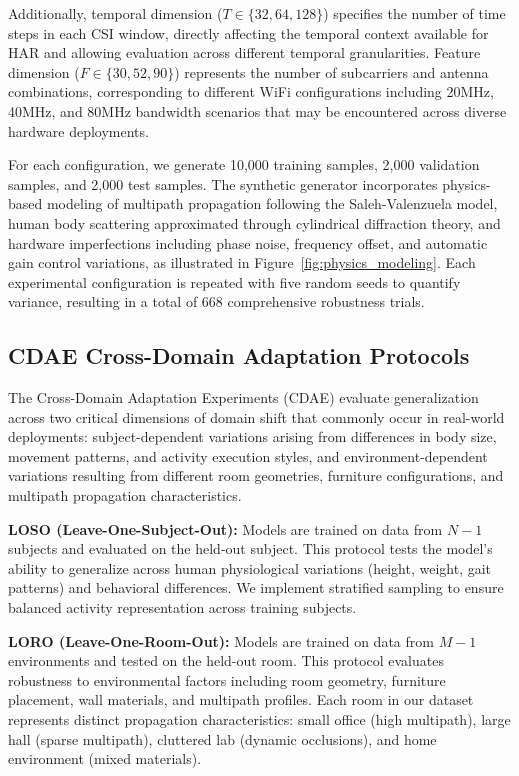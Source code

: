 \documentclass[lettersize,journal]{IEEEtran}
\begin{document}
Additionally, temporal dimension ($T \in \{32, 64, 128\}$) specifies the number of time steps in each CSI window, directly affecting the temporal context available for HAR and allowing evaluation across different temporal granularities. Feature dimension ($F \in \{30, 52, 90\}$) represents the number of subcarriers and antenna combinations, corresponding to different WiFi configurations including 20MHz, 40MHz, and 80MHz bandwidth scenarios that may be encountered across diverse hardware deployments.

For each configuration, we generate 10,000 training samples, 2,000 validation samples, and 2,000 test samples. The synthetic generator incorporates physics-based modeling of multipath propagation following the Saleh-Valenzuela model, human body scattering approximated through cylindrical diffraction theory, and hardware imperfections including phase noise, frequency offset, and automatic gain control variations, as illustrated in Figure~\ref{fig:physics_modeling}. Each experimental configuration is repeated with five random seeds to quantify variance, resulting in a total of 668 comprehensive robustness trials.

\subsection{CDAE Cross-Domain Adaptation Protocols}

The Cross-Domain Adaptation Experiments (CDAE) evaluate generalization across two critical dimensions of domain shift that commonly occur in real-world deployments: subject-dependent variations arising from differences in body size, movement patterns, and activity execution styles, and environment-dependent variations resulting from different room geometries, furniture configurations, and multipath propagation characteristics.

\textbf{LOSO (Leave-One-Subject-Out):} Models are trained on data from $N-1$ subjects and evaluated on the held-out subject. This protocol tests the model's ability to generalize across human physiological variations (height, weight, gait patterns) and behavioral differences. We implement stratified sampling to ensure balanced activity representation across training subjects.

\textbf{LORO (Leave-One-Room-Out):} Models are trained on data from $M-1$ environments and tested on the held-out room. This protocol evaluates robustness to environmental factors including room geometry, furniture placement, wall materials, and multipath profiles. Each room in our dataset represents distinct propagation characteristics: small office (high multipath), large hall (sparse multipath), cluttered lab (dynamic occlusions), and home environment (mixed materials).
\end{document}
